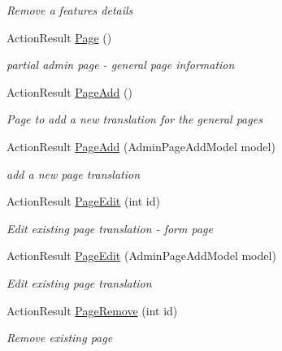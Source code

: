 \begin{DoxyCompactItemize}
\begin{DoxyCompactList}\small\item\em Remove a feature\textquotesingle{}s details \end{DoxyCompactList}\item 
Action\+Result \mbox{\hyperlink{class_ox_tots_1_1_controllers_1_1_admin_controller_ae0bdff5f4ace8447c16e89cfd50c7f80}{Page}} ()
\begin{DoxyCompactList}\small\item\em partial admin page -\/ general page information \end{DoxyCompactList}\item 
Action\+Result \mbox{\hyperlink{class_ox_tots_1_1_controllers_1_1_admin_controller_a7235fdd29f1eef059766d124082bf26b}{Page\+Add}} ()
\begin{DoxyCompactList}\small\item\em Page to add a new translation for the general pages \end{DoxyCompactList}\item 
Action\+Result \mbox{\hyperlink{class_ox_tots_1_1_controllers_1_1_admin_controller_a1a17d285ff2f06ee28c6a27481a92223}{Page\+Add}} (Admin\+Page\+Add\+Model model)
\begin{DoxyCompactList}\small\item\em add a new page translation \end{DoxyCompactList}\item 
Action\+Result \mbox{\hyperlink{class_ox_tots_1_1_controllers_1_1_admin_controller_ab994090c83d0323dbcbac77d15818361}{Page\+Edit}} (int id)
\begin{DoxyCompactList}\small\item\em Edit existing page translation -\/ form page \end{DoxyCompactList}\item 
Action\+Result \mbox{\hyperlink{class_ox_tots_1_1_controllers_1_1_admin_controller_ab6290bc1c576a764a0928f61b5b2e801}{Page\+Edit}} (Admin\+Page\+Add\+Model model)
\begin{DoxyCompactList}\small\item\em Edit existing page translation \end{DoxyCompactList}\item 
Action\+Result \mbox{\hyperlink{class_ox_tots_1_1_controllers_1_1_admin_controller_a42a5cf1ccab7cc18cdd5b1ccdd5b3287}{Page\+Remove}} (int id)
\begin{DoxyCompactList}\small\item\em Remove existing page \end{DoxyCompactList}\item 

\end{DoxyCompactItemize}
